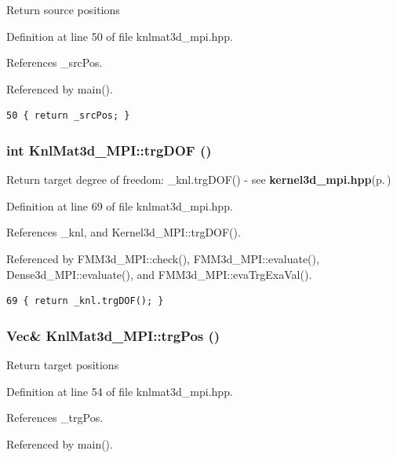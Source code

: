 Return source positions 

Definition at line 50 of file knlmat3d\_\-mpi.hpp.

References \_\-src\-Pos.

Referenced by main().

\footnotesize\begin{verbatim}50 { return _srcPos; }
\end{verbatim}\normalsize 


\subsubsection{\setlength{\rightskip}{0pt plus 5cm}int Knl\-Mat3d\_\-MPI::trg\-DOF ()\hspace{0.3cm}{\tt  [inline]}}\label{classKnlMat3d__MPI_ea43c1f768349e86110e4e2d06e38d10_ea43c1f768349e86110e4e2d06e38d10}


Return target degree of freedom: \_\-knl.trg\-DOF() - see {\bf kernel3d\_\-mpi.hpp}{\rm (p.\,\pageref{kernel3d__mpi_8hpp})} 

Definition at line 69 of file knlmat3d\_\-mpi.hpp.

References \_\-knl, and Kernel3d\_\-MPI::trg\-DOF().

Referenced by FMM3d\_\-MPI::check(), FMM3d\_\-MPI::evaluate(), Dense3d\_\-MPI::evaluate(), and FMM3d\_\-MPI::eva\-Trg\-Exa\-Val().

\footnotesize\begin{verbatim}69 { return _knl.trgDOF(); }
\end{verbatim}\normalsize 


\subsubsection{\setlength{\rightskip}{0pt plus 5cm}Vec\& Knl\-Mat3d\_\-MPI::trg\-Pos ()\hspace{0.3cm}{\tt  [inline]}}\label{classKnlMat3d__MPI_7dc770563c182703b1986abb06c6dbbd_7dc770563c182703b1986abb06c6dbbd}


Return target positions 

Definition at line 54 of file knlmat3d\_\-mpi.hpp.

References \_\-trg\-Pos.

Referenced by main().

